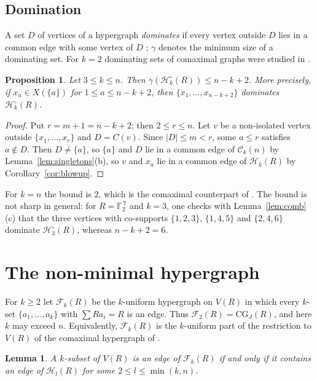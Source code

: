 \documentclass{amsart}
\newtheorem{lemma}[theorem]{Lemma}
\newtheorem{proposition}[theorem]{Proposition}
\theoremstyle{definition}
\theoremstyle{remark}
\newcommand{\CG}{\mathrm{CG}_J}
\newcommand{\cC}{\mathcal{C}}
\newcommand{\cH}{\mathcal{H}}
\begin{document}
\subsection*{Domination}
A set $D$ of vertices of a hypergraph \emph{dominates} if every vertex outside $D$ lies in a common edge with some vertex of $D$ \cite[Definition~1.3]{MNR23}; $\gamma$ denotes the minimum size of a dominating set. For $k=2$ dominating sets of comaximal graphs were studied in \cite{MNR15}.

\begin{proposition}\label{prop:dom}
Let $3\le k\le n$. Then $\gamma(\cH_k^\circ(R))\le n-k+2$. More precisely, if $x_a\in X(\{a\})$ for $1\le a\le n-k+2$, then $\{x_1,\dots,x_{n-k+2}\}$ dominates $\cH_k^\circ(R)$.
\end{proposition}

\begin{proof}
Put $r=m+1=n-k+2$; then $2\le r\le n$. Let $v$ be a non-isolated vertex outside $\{x_1,\dots,x_r\}$ and $D=C(v)$. Since $|D|\le m<r$, some $a\le r$ satisfies $a\notin D$. Then $D\ne\{a\}$, so $\{a\}$ and $D$ lie in a common edge of $\cC_k(n)$ by Lemma~\ref{lem:singletons}(b), so $v$ and $x_a$ lie in a common edge of $\cH_k(R)$ by Corollary~\ref{cor:blowup}.
\end{proof}

For $k=n$ the bound is $2$, which is the comaximal counterpart of \cite[Theorem~2.1]{MNR23}. The bound is not sharp in general: for $R=\mathbb F_2^{\,7}$ and $k=3$, one checks with Lemma~\ref{lem:comb}(c) that the three vertices with co-supports $\{1,2,3\}$, $\{1,4,5\}$ and $\{2,4,6\}$ dominate $\cH_3^\circ(R)$, whereas $n-k+2=6$.

\section{The non-minimal hypergraph}\label{sec:full}

For $k\ge2$ let $\mathcal F_k(R)$ be the $k$-uniform hypergraph on $V(R)$ in which every $k$-set $\{a_1,\dots,a_k\}$ with $\sum Ra_i=R$ is an edge. Thus $\mathcal F_2(R)=\CG(R)$, and here $k$ may exceed $n$. Equivalently, $\mathcal F_k(R)$ is the $k$-uniform part of the restriction to $V(R)$ of the comaximal hypergraph of \cite{Mil15}.

\begin{lemma}\label{lem:Fdet}
A $k$-subset of $V(R)$ is an edge of $\mathcal F_k(R)$ if and only if it contains an edge of $\cH_l(R)$ for some $2\le l\le\min(k,n)$.
\end{lemma}
\end{document}
